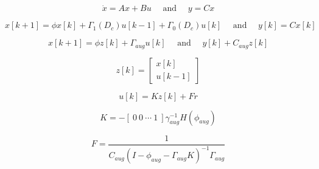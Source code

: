 \begin{equation}
\dot{x}  =  A x  +   B u  \quad{\text{   and   } }\quad  y  =  C x  
\label{eq:code1}
\end{equation}


\begin{equation}
x[k+1]= \phi x [k]+ \Gamma_1(D_c)u[k-1]+\Gamma_0(D_c)u[k] \quad \text{ and } \quad y[k] = C x[k]
\label{eq:code2}
\end{equation}


\begin{equation}
x[k+1]= \phi z [k]+ \Gamma_{aug}u[k] \quad \text{ and } \quad y[k] + C_{aug} z[k]
\label{eq:code3}
\end{equation}

\begin{equation}
z[k]=\begin{bmatrix}
x[k]\\
u[k-1]
\end{bmatrix}
\label{eq:code6}
\end{equation}

\begin{equation}
u[k] = Kz[k] + Fr 
\label{eq:code7} 
\end{equation}


\begin{equation}
 K = -[ \ 0 \ 0 \ \cdots \ 1 \ ] \gamma_{aug}^{-1} H(\phi_{aug})
\label{eq:code4} 
\end{equation}

\begin{equation}
 F = \dfrac{1}{C_{aug} (I-\phi_{aug}-\Gamma_{aug}K)^{-1}\Gamma_{aug}}
\label{eq:code5}
\end{equation}



